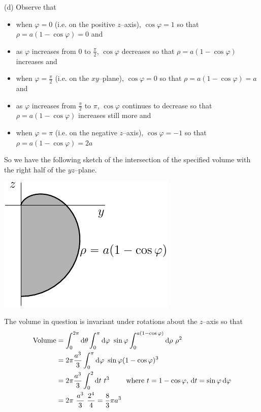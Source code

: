 \begin{solution}
(d)  Observe that
\begin{itemize}
\item
when $\varphi=0$ (i.e. on the positive $z$--axis), $\cos\varphi=1$ so that
        $\rho=a(1-\cos\varphi)=0$ and
\item
as $\varphi$ increases from $0$ to $\frac{\pi}{2}$, $\cos\varphi$ decreases
         so that $\rho=a(1-\cos\varphi)$ increases and
\item
when $\varphi=\frac{\pi}{2}$ (i.e. on the $xy$--plane), $\cos\varphi=0$ so that
       $\rho=a(1-\cos\varphi)=a$ and
\item
as $\varphi$ increases from  $\frac{\pi}{2}$ to $\pi$, $\cos\varphi$
      continues to decrease so that
          $\rho=a(1-\cos\varphi)$ increases still more and
\item
when $\varphi=\pi$ (i.e. on the negative $z$--axis), $\cos\varphi=-1$ so that
        $\rho=a(1-\cos\varphi)=2a$
\end{itemize}
So we have the following sketch of the intersection of the specified 
volume with the right half of the $yz$--plane.
\begin{center}
     \includegraphics{fig/domain3d.pdf}
\end{center}
The volume in question is invariant under rotations about
the $z$--axis so that
\begin{align*}
\text{Volume}
&= \int_{0}^{2\pi} \mathrm{d}\theta\int_0^{\pi}\mathrm{d}\varphi\ \sin\varphi\int_{0}^{a(1-\cos\varphi)}\mathrm{d}\rho\ \rho^2 
\\
&=2\pi\frac{a^3}{3} \int_0^{\pi}\mathrm{d}\varphi\ \sin\varphi(1-\cos\varphi)^3 \\
&=2\pi\frac{a^3}{3} \int_0^2\mathrm{d}t\ t^3
\qquad\hbox{ where $t=1-\cos\varphi$, $\mathrm{d}t=\sin\varphi\,\mathrm{d}\varphi$} \\
&=2\pi\ \frac{a^3}{3}\ \frac{2^4}{4}
=\frac{8}{3}\pi a^3
\end{align*}
\end{solution}



